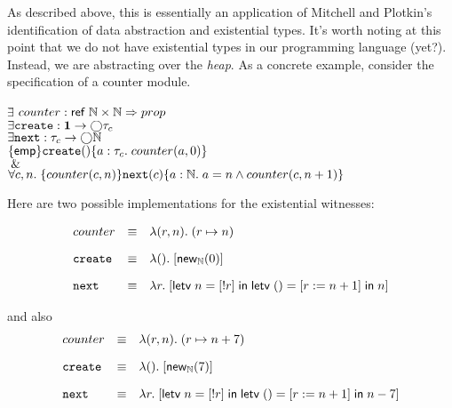 As described above, this is essentially an application of Mitchell and
Plotkin's identification of data abstraction and existential
types. It's worth noting at this point that we do not have existential
types in our programming language (yet?). Instead, we are abstracting
over the \emph{heap}. As a concrete example, consider the
specification of a counter module.

\begin{tabbing}
$\exists $\= $counter : \mathsf{ref}\;\mathbb{N} \times \mathbb{N} \Rightarrow prop$ \\
$\exists \mathtt{create} : \mathbf{1} \to \bigcirc{\tau_c}$ \\
$\exists \mathtt{next} : \tau_c \to \bigcirc{\mathbb{N}}$ \\
\> $\{{\mathsf{emp}}\}{\mathtt{create}()}\{{a:\tau_c}.\;{counter(a, 0)}\}$ \\
\> $\;\&\;$ \\
\> $\forall c, n.\; \{{counter(c, n)}\}{\mathtt{next}(c)}\{{a:\mathbb{N}}.\;{a = n \land counter(c, n+1)}\}$
\\
\end{tabbing} 

Here are two possible implementations for the existential witnesses:

\begin{displaymath}
\begin{array}{lcl}
counter & \equiv & \lambda (r, n).\; (r \mapsto n) \\[1em]
\mathtt{create} & \equiv & \lambda ().\; [\mathsf{new}_{\mathbb{N}}(0)] \\[1em]
\mathtt{next}  & \equiv & \lambda r.\; [\mathsf{letv}\;n = [!r]\;\mathsf{in}\;
                                        \mathsf{letv}\;() = [r := n + 1]\;\mathsf{in}\;n] \\
\end{array}
\end{displaymath}

and also                                        
\begin{displaymath}
\begin{array}{lcl}
counter & \equiv & \lambda (r, n).\; (r \mapsto n + 7) \\[1em]
\mathtt{create} & \equiv & \lambda ().\; [\mathsf{new}_{\mathbb{N}}(7)] \\[1em]
\mathtt{next}  & \equiv & \lambda r.\; [\mathsf{letv}\;n = [!r]\;\mathsf{in}\;
                                        \mathsf{letv}\;() = [r := n + 1]\;\mathsf{in}\;n - 7] \\
\end{array}
\end{displaymath}

